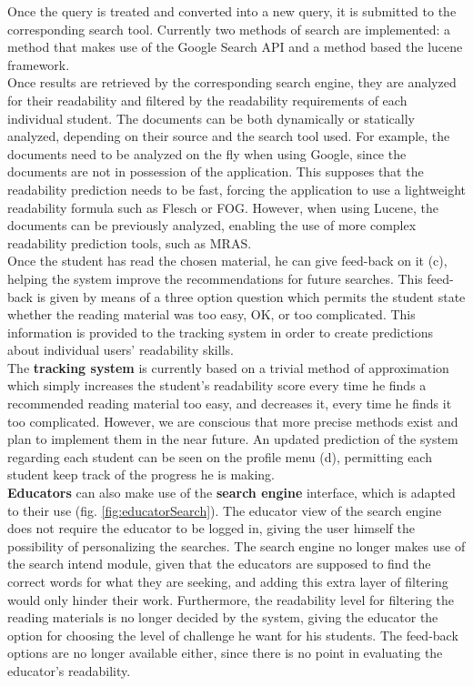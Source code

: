 \documentclass{sig-alternate-05-2015}
\begin{document}
Once the query is treated and converted into a new query, it is submitted to the corresponding search tool. Currently two methods of search are implemented: a method that makes use of the Google Search API and a method based the lucene framework.
\\

Once results are retrieved by the corresponding search engine, they are analyzed for their readability and filtered by the readability requirements of each individual student. The documents can be both dynamically or statically analyzed, depending on their source and the search tool used. For example, the documents need to be analyzed on the fly when using Google, since the documents are not in possession of the application. This supposes that the readability prediction needs to be fast, forcing the application to use a lightweight readability formula such as Flesch or FOG. However, when using Lucene, the documents can be previously analyzed, enabling the use of more complex readability prediction tools, such as MRAS.\\


Once the student has read the chosen material, he can give feed-back on it (c), helping the system improve the recommendations for future searches. This feed-back is given by means of a three option question which permits the student state whether the reading material was too easy, OK, or too complicated. This information is provided to the tracking system in order to create predictions about individual users' readability skills.\\ 

The \textbf{tracking system} is currently based on a trivial method of approximation which simply increases the student's readability score every time he finds a recommended reading material too easy, and decreases it, every time he finds it too complicated. However, we are conscious that more precise methods exist and plan to implement them in the near future. An updated prediction of the system regarding each student can be seen on the profile menu (d), permitting each student keep track of the progress he is making.\\



\textbf{Educators} can also make use of the \textbf{search engine} interface, which is adapted to their use (fig. \ref{fig:educatorSearch}). The educator view of the search engine does not require the educator to be logged in, giving the user himself the possibility of personalizing the searches. The search engine no longer makes use of the search intend module, given that the educators are supposed to find the correct words for what they are seeking, and adding this extra layer of filtering would only hinder their work. Furthermore, the readability level for filtering the reading materials is no longer decided by the system, giving the educator the option for choosing the level of challenge he want for his students. The feed-back options are no longer available either, since there is no point in evaluating the educator's readability.\\
\end{document}
